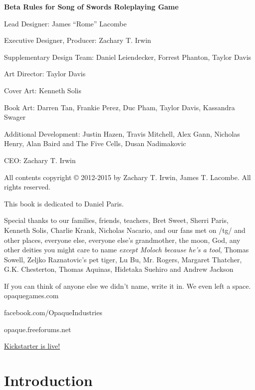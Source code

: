 \documentclass[oneside,11pt,english]{book}
\begin{document}
\begin{center}
  \vfill
  \textbf{Beta Rules for Song of Swords Roleplaying Game}\par
  Lead Designer: James “Rome” Lacombe\par
  Executive Designer, Producer: Zachary T. Irwin\par
  Supplementary Design Team: Daniel Leiendecker, Forrest Phanton, Taylor Davis\par
  Art Director: Taylor Davis\par
  Cover Art: Kenneth Solis\par
  Book Art: Darren Tan, Frankie Perez, Duc Pham, Taylor Davis, Kassandra Swager\par


  Additional Development: Justin Hazen, Travis Mitchell, Alex Gann, Nicholas
  Henry, Alan Baird and The Five Cells, Dusan Nadimakovic

  CEO: Zachary T. Irwin\par


  All contents copyright © 2012-2015 by Zachary T. Irwin, James T. Lacombe. All
  rights reserved. 


  This book is dedicated to Daniel Paris.
  \vfill

  Special thanks to our families, friends, teachers, Bret Sweet, Sherri Paris,
  Kenneth Solis, Charlie Krank, Nicholas Nacario, and our fans met on /tg/ and
  other places, everyone else, everyone else’s grandmother, the moon, God, any
  other deities you might care to name \textit{except Moloch because he’s a
    tool}, Thomas Sowell, Zeljko Raznatovic’s pet tiger, Lu Bu, Mr. Rogers,
  Margaret Thatcher, G.K. Chesterton, Thomas Aquinas, Hidetaka Suehiro and
  Andrew Jackson 

  \vspace{1cm}
  If you can think of anyone else we didn’t name, write it in. We even left a
  space.  
  \vfill
  opaquegames.com

  facebook.com/OpaqueIndustries

  opaque.freeforums.net

  \href{https://www.kickstarter.com/projects/2006613790/song-of-swords-tabletop-roleplaying-game?ref=1p1zmb}{Kickstarter is live!}
\end{center}
\clearpage
{}
\tableofcontents %
\mainmatter
\chapter{Introduction}\label{ch:intro}
\newlength{\oldintextsep}
\setlength{\oldintextsep}{\intextsep}
\newpage
\end{document}
